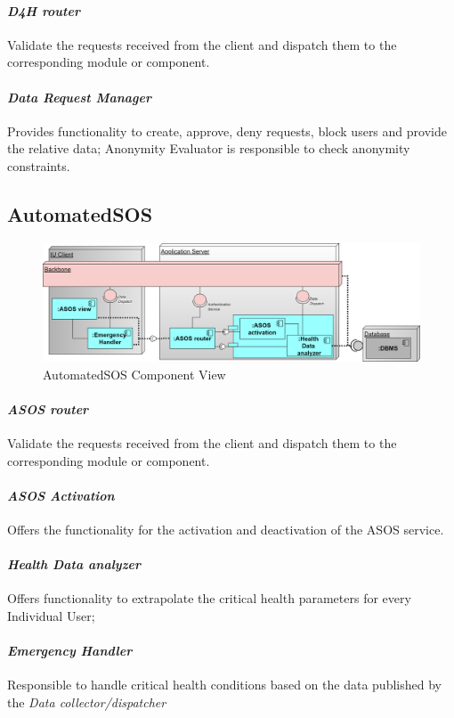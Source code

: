 \paragraph{\textit{D4H router}} Validate the requests received from the client and dispatch them to the corresponding module or component.
\paragraph{\textit{Data Request Manager}} Provides functionality to create, approve, deny requests, block users and provide the relative data; Anonymity Evaluator is responsible to check anonymity constraints. 
\subsection{AutomatedSOS}
\label{subsect:ASOSComponentView}
\begin{figure}[H]
 \caption{AutomatedSOS Component View}
\centering
\includegraphics[width = \textwidth]{sections/architecturalDesign/ASOSDiagram.png}
\end{figure}
\paragraph{\textit{ASOS router}} Validate the requests received from the client and dispatch them to the corresponding module or component.
\paragraph{\textit{ASOS Activation}} Offers the functionality for the activation and deactivation of the ASOS service.
\paragraph{\textit{Health Data analyzer}} Offers functionality to extrapolate the critical health parameters for every Individual User;
\paragraph{\textit{Emergency Handler}} Responsible to handle critical health conditions based on the data published by the \textit{Data collector/dispatcher}
\clearpage
